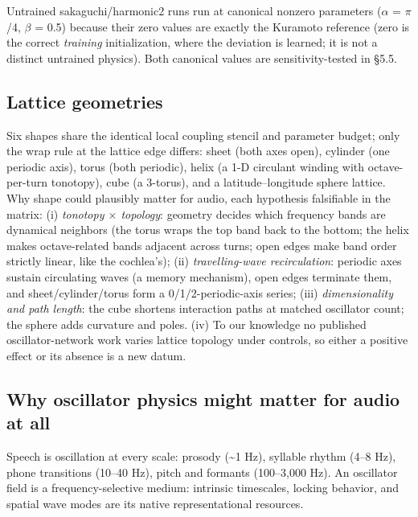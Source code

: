 \documentclass[10pt]{article}
\begin{document}
Untrained sakaguchi/harmonic2 runs run at canonical nonzero parameters
(\ensuremath{\alpha} = \ensuremath{\pi}/4, \ensuremath{\beta} = 0.5)
because their zero values are exactly the Kuramoto reference (zero is
the correct \emph{training} initialization, where the deviation is
learned; it is not a distinct untrained physics). Both canonical values
are sensitivity-tested in §5.5.

\subsection{Lattice geometries}\label{lattice-geometries}

Six shapes share the identical local coupling stencil and parameter
budget; only the wrap rule at the lattice edge differs: sheet (both axes
open), cylinder (one periodic axis), torus (both periodic), helix (a 1-D
circulant winding with octave-per-turn tonotopy), cube (a 3-torus), and
a latitude--longitude sphere lattice. Why shape could plausibly matter
for audio, each hypothesis falsifiable in the matrix: (i) \emph{tonotopy
\ensuremath{\times} topology}: geometry decides which frequency bands
are dynamical neighbors (the torus wraps the top band back to the
bottom; the helix makes octave-related bands adjacent across turns; open
edges make band order strictly linear, like the cochlea's); (ii)
\emph{travelling-wave recirculation}: periodic axes sustain circulating
waves (a memory mechanism), open edges terminate them, and
sheet/cylinder/torus form a 0/1/2-periodic-axis series; (iii)
\emph{dimensionality and path length}: the cube shortens interaction
paths at matched oscillator count; the sphere adds curvature and poles.
(iv) To our knowledge no published oscillator-network work varies
lattice topology under controls, so either a positive effect or its
absence is a new datum.

\subsection{Why oscillator physics might matter for audio at
all}\label{why-oscillator-physics-might-matter-for-audio-at-all}

Speech is oscillation at every scale: prosody (\textasciitilde1 Hz),
syllable rhythm (4--8 Hz), phone transitions (10--40 Hz), pitch and
formants (100--3,000 Hz). An oscillator field is a frequency-selective
medium: intrinsic timescales, locking behavior, and spatial wave modes
are its native representational resources.
\end{document}
